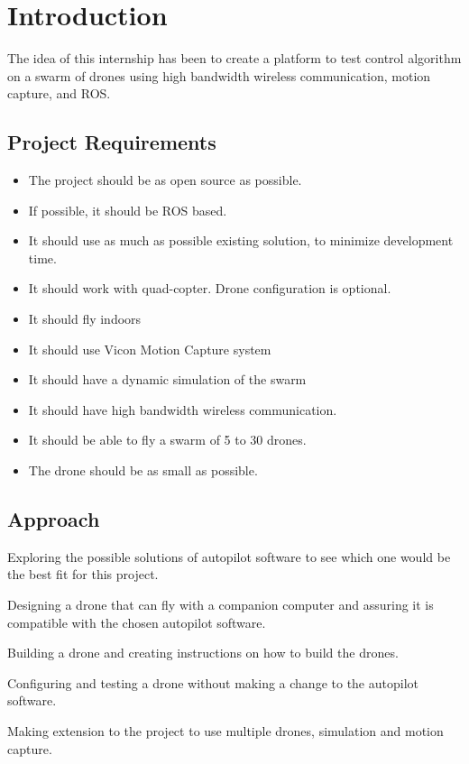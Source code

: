 \chapter{Introduction}

The idea of this internship has been to create a platform to test control algorithm on a swarm of drones using high bandwidth wireless communication, motion capture, and ROS.

\section{Project Requirements}
\begin{itemize}
    \item The project should be as open source as possible.
    \item If possible, it should be ROS based.
    \item It should use as much as possible existing solution, to minimize development time.
    \item It should work with quad-copter. Drone configuration is optional.
    \item It should fly indoors
    \item It should use Vicon Motion Capture system
    \item It should have a dynamic simulation of the swarm
    \item It should have high bandwidth wireless communication.
    \item It should be able to fly a swarm of 5 to 30 drones.
    \item The drone should be as small as possible.
\end{itemize}

\section{Approach}
Exploring the possible solutions of autopilot software to see which one would be the best fit for this project.

Designing a drone that can fly with a companion computer and assuring it is compatible with the chosen autopilot software.

Building a drone and creating instructions on how to build the drones.

Configuring and testing a drone without making a change to the autopilot software.

Making extension to the project to use multiple drones, simulation and motion capture.
